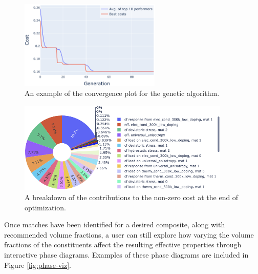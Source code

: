 \documentclass[letterpaper,12pt]{formatfile}
\begin{document}
\begin{figure}[H]
    \centering
        \includegraphics[width=0.6\textwidth]{figures/convg.png}
        \caption{An example of the convergence plot for the genetic algorithm.}
        \label{fig:convg}
\end{figure}

\begin{figure}[H]
    \centering
        \includegraphics[width=0.9\textwidth]{figures/cost-func-contribs.png}
        \caption{A breakdown of the contributions to the non-zero cost at the end of optimization.}
        \label{fig:cost-func-contribs}
\end{figure}

Once matches have been identified for a desired composite, along with recommended volume fractions, a user can still explore how varying the volume fractions of the constituents affect the resulting effective properties through interactive phase diagrams. Examples of these phase diagrams are included in Figure \ref{fig:phase-viz}.
\end{document}
